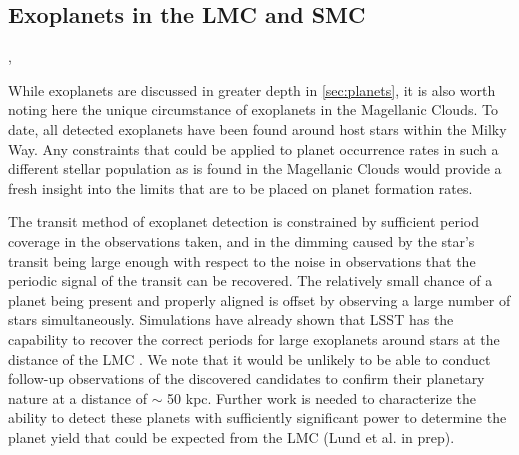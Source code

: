 %
%

\subsection{Exoplanets in the LMC and SMC}
\def\secname{\chpname:MC_exoplanets}\label{sec:\secname}

,

While exoplanets are discussed in greater depth in \autoref{sec:planets}, it is
also worth noting here the unique circumstance of exoplanets in the
Magellanic Clouds. To date, all detected exoplanets have been found around
host stars within the Milky Way. Any constraints that could be applied to
planet occurrence rates in such a different stellar population as is found
in the Magellanic Clouds would provide a fresh insight into the limits
that are to be placed on planet formation rates.

The transit method of exoplanet detection is constrained by sufficient
period coverage in the observations taken, and in the dimming caused by
the star's transit being large enough with respect to the noise in
observations that the periodic signal of the transit can be recovered.
The relatively small chance of a planet being present and properly
aligned is offset by observing a large number of stars simultaneously.
Simulations have already shown that LSST has the capability to recover
the correct periods for large exoplanets around stars at the distance of
the LMC \citet{2015AJ....149...16L}.  We note that it would be unlikely
to be able to conduct follow-up observations of the discovered
candidates to confirm their planetary nature at a distance of $\sim$
50 kpc.  Further work is needed to characterize the ability to detect
these planets with sufficiently significant power to determine the
planet yield that could be expected from the LMC (Lund et al. in prep).



